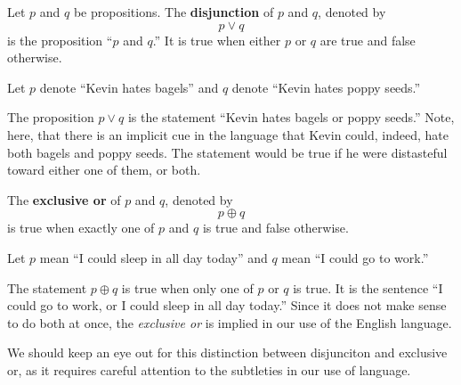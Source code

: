   Let \(p\) and \(q\) be propositions. The \textbf{disjunction} of \(p\) and \(q\), denoted by \[ p \vee q \] is the proposition
  ``\(p\) and \(q\).'' It is true when either \(p\) or \(q\) are true and false otherwise.
  \begin{ex}
    Let $p$ denote ``Kevin hates bagels'' and $q$ denote ``Kevin hates poppy seeds.''

    The proposition $p \vee q$ is the statement ``Kevin hates bagels or poppy seeds.''
    Note, here, that there is an implicit cue in the language that Kevin could, indeed, hate both bagels and poppy seeds.
    The statement would be true if he were distasteful toward either one of them, or both.
  \end{ex}

  The \textbf{exclusive or} of \(p\) and \(q\), denoted by \[p \oplus q\] is true when exactly one of \(p\) and \(q\) is true and false otherwise.
  \begin{ex}
    Let $p$ mean ``I could sleep in all day today'' and $q$ mean ``I could go to work.''

    The statement $p \oplus q$ is true when only one of $p$ or $q$ is true.
    It is the sentence ``I could go to work, or I could sleep in all day today.''
    Since it does not make sense to do both at once, the \emph{exclusive or} is implied in our use of the English language.

    We should keep an eye out for this distinction between disjunciton and exclusive or, as it requires careful
    attention to the subtleties in our use of language.
  \end{ex}

